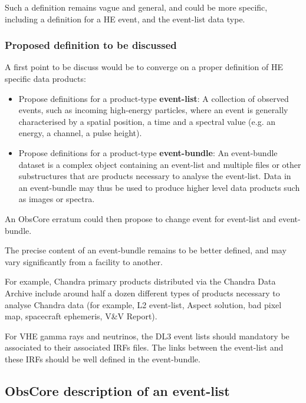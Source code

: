 \documentclass[11pt,a4paper]{ivoa}
\begin{document}
{Such a definition remains vague and general, and could be more specific, including a definition for a HE event, and the
event-list data type.

\subsubsection{Proposed definition to be discussed}

A first point to be discuss would be to converge on a proper definition of HE specific data products:
\begin{itemize}
    \item Propose definitions for a product-type \textbf{event-list}: A collection of observed events, such as incoming
    high-energy particles, where an event is generally characterised by a spatial position, a time and a spectral value
    (e.g. an energy, a channel, a pulse height).
    \item Propose definitions for a product-type \textbf{event-bundle}: An event-bundle dataset is a complex object
    containing an event-list and multiple files or other substructures that are products necessary to analyse the
    event-list. Data in an event-bundle may thus be used to produce higher level data products such as images or spectra.
\end{itemize}

An ObsCore erratum could then propose to change event for event-list and event-bundle.

The precise content of an event-bundle remains to be better defined, and may vary significantly from a facility to another.

For example, Chandra primary products distributed via the Chandra Data Archive include around half a dozen different
types of products necessary to analyse Chandra data (for example, L2 event-list, Aspect solution,
bad pixel map, spacecraft ephemeris, V\&V Report).


For VHE gamma rays and neutrinos, the DL3 event lists should mandatory be associated to their associated IRFs files. The
links between the event-list and these IRFs should be well defined in the event-bundle.


\subsection{ObsCore description of an event-list}
\label{sec:obscore_he}

}
\end{document}
